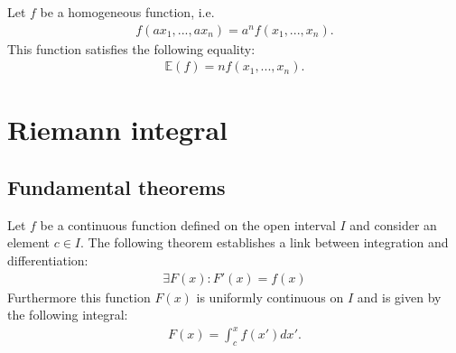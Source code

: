     \begin{theorem}[Euler]\label{calculus:theorem:euler_homogeneous_functions}
        Let $f$ be a homogeneous function, i.e.
        \begin{gather}
            f(ax_1, ..., ax_n) = a^nf(x_1, ..., x_n).
        \end{gather}
        This function satisfies the following equality:
        \begin{gather}
            \mathbb{E}(f) = nf(x_1, ..., x_n).
        \end{gather}
    \end{theorem}

\section{Riemann integral}


\subsection{Fundamental theorems}

    \begin{theorem}
        Let $f$ be a continuous  function defined on the open interval $I$ and consider an element $c \in I$. The following theorem establishes a link between integration and differentiation:
        \begin{gather}
            \exists F(x) :F'(x) = f(x)
        \end{gather}
        Furthermore this function $F(x)$ is uniformly continuous on $I$ and is given by the following integral:
        \begin{gather}
            \label{calculus:first_fundamental_theorem}
            F(x) = \int_c^xf(x')dx'.
        \end{gather}
    \end{theorem}

